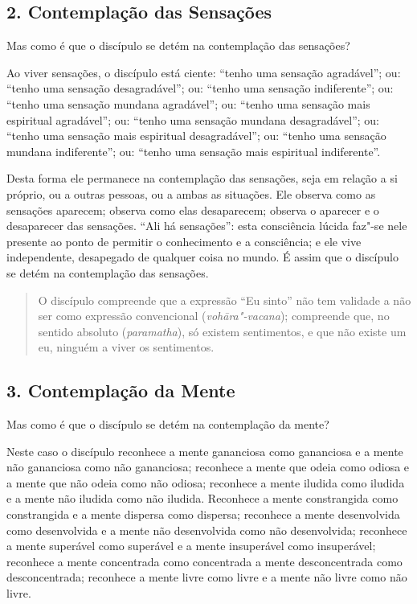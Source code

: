 \subsection{2. Contemplação das Sensações}


Mas como é que o discípulo se detém na contemplação das sensações?

Ao viver sensações, o discípulo está ciente: “tenho uma sensação agradável”;
ou: “tenho uma sensação desagradável”; ou: “tenho uma sensação indiferente”;
ou: “tenho uma sensação mundana agradável”; ou: “tenho uma sensação mais
espiritual agradável”; ou: “tenho uma sensação mundana desagradável”; ou:
“tenho uma sensação mais espiritual desagradável”; ou: “tenho uma sensação
mundana indiferente”; ou: “tenho uma sensação mais espiritual indiferente”.

Desta forma ele permanece na contemplação das sensações, seja em relação a si
próprio, ou a outras pessoas, ou a ambas as situações. Ele observa como as
sensações aparecem; observa como elas desaparecem; observa o aparecer e o
desaparecer das sensações. “Ali há sensações”: esta consciência lúcida faz"-se
nele presente ao ponto de permitir o conhecimento e a consciência; e ele vive
independente, desapegado de qualquer coisa no mundo. É assim que o discípulo se
detém na contemplação das sensações.


\begin{quote}
  O discípulo compreende que a expressão “Eu sinto” não tem validade a não ser
  como expressão convencional (\emph{vohāra"-vacana}); compreende que, no sentido
  absoluto (\emph{paramatha}), só existem sentimentos, e que não existe um eu,
  ninguém a viver os sentimentos.
\end{quote}

\subsection{3. Contemplação da Mente}


Mas como é que o discípulo se detém na contemplação da mente?

Neste caso o discípulo reconhece a mente gananciosa como gananciosa e a mente
não gananciosa como não gananciosa; reconhece a mente que odeia como odiosa e a
mente que não odeia como não odiosa; reconhece a mente iludida como iludida e a
mente não iludida como não iludida. Reconhece a mente constrangida como
constrangida e a mente dispersa como dispersa; reconhece a mente desenvolvida
como desenvolvida e a mente não desenvolvida como não desenvolvida; reconhece a
mente superável como superável e a mente insuperável como insuperável; reconhece
a mente concentrada como concentrada a mente desconcentrada como desconcentrada;
reconhece a mente livre como livre e a mente não livre como não livre.

